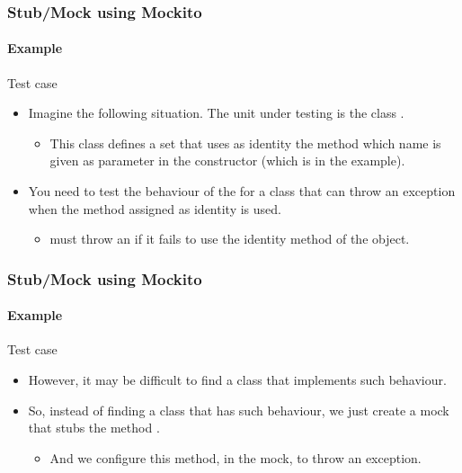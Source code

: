 \begin{frame}[hasprev=true, hasnext=true]
\frametitle{Stub/Mock using Mockito}
\framesubtitle{Example}

\begin{block}{Test case}
\begin{itemize}
	\item Imagine the following situation. The unit under testing is the class
	.
	\begin{itemize}
		\item This class defines a set that uses as identity the method which
		name is given as parameter in the constructor (which is
		 in the example).
	\end{itemize}

	\item You need to test the behaviour of the  for
	a class that can throw an exception when the method assigned as identity
	is used.
	\begin{itemize}
		\item {} must throw an
		 if it fails to use the identity
		method of the object.
	\end{itemize}
\end{itemize}
\end{block}
\end{frame}



\begin{frame}[hasprev=true, hasnext=true]
\frametitle{Stub/Mock using Mockito}
\framesubtitle{Example}

\begin{block}{Test case}
\begin{itemize}
	\item However, it may be difficult to find a class that implements such
	behaviour.

	\item So, instead of finding a class that has such behaviour, we just
	create a mock that stubs the method .
	\begin{itemize}
		\item And we configure this method, in the mock, to throw an exception.
	\end{itemize}
\end{itemize}
\end{block}
\end{frame}


